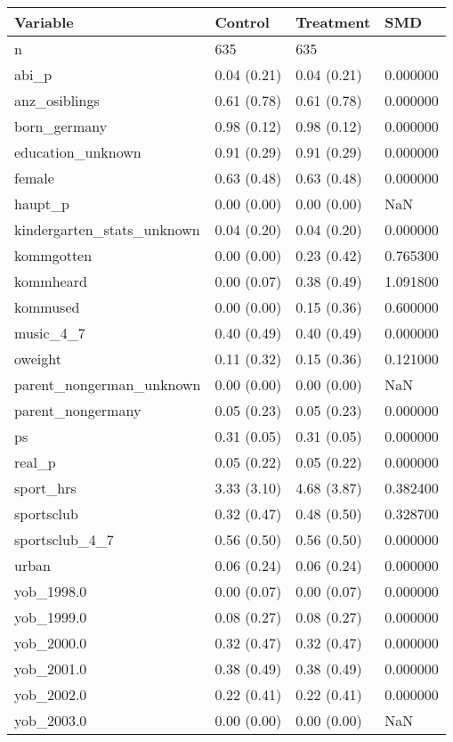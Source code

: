 \begin{tabular}{llll}
\toprule
Variable & Control & Treatment & SMD \\
\midrule
n & 635 & 635 &  \\
abi\_p & 0.04 (0.21) & 0.04 (0.21) & 0.000000 \\
anz\_osiblings & 0.61 (0.78) & 0.61 (0.78) & 0.000000 \\
born\_germany & 0.98 (0.12) & 0.98 (0.12) & 0.000000 \\
education\_unknown & 0.91 (0.29) & 0.91 (0.29) & 0.000000 \\
female & 0.63 (0.48) & 0.63 (0.48) & 0.000000 \\
haupt\_p & 0.00 (0.00) & 0.00 (0.00) & NaN \\
kindergarten\_stats\_unknown & 0.04 (0.20) & 0.04 (0.20) & 0.000000 \\
kommgotten & 0.00 (0.00) & 0.23 (0.42) & 0.765300 \\
kommheard & 0.00 (0.07) & 0.38 (0.49) & 1.091800 \\
kommused & 0.00 (0.00) & 0.15 (0.36) & 0.600000 \\
music\_4\_7 & 0.40 (0.49) & 0.40 (0.49) & 0.000000 \\
oweight & 0.11 (0.32) & 0.15 (0.36) & 0.121000 \\
parent\_nongerman\_unknown & 0.00 (0.00) & 0.00 (0.00) & NaN \\
parent\_nongermany & 0.05 (0.23) & 0.05 (0.23) & 0.000000 \\
ps & 0.31 (0.05) & 0.31 (0.05) & 0.000000 \\
real\_p & 0.05 (0.22) & 0.05 (0.22) & 0.000000 \\
sport\_hrs & 3.33 (3.10) & 4.68 (3.87) & 0.382400 \\
sportsclub & 0.32 (0.47) & 0.48 (0.50) & 0.328700 \\
sportsclub\_4\_7 & 0.56 (0.50) & 0.56 (0.50) & 0.000000 \\
urban & 0.06 (0.24) & 0.06 (0.24) & 0.000000 \\
yob\_1998.0 & 0.00 (0.07) & 0.00 (0.07) & 0.000000 \\
yob\_1999.0 & 0.08 (0.27) & 0.08 (0.27) & 0.000000 \\
yob\_2000.0 & 0.32 (0.47) & 0.32 (0.47) & 0.000000 \\
yob\_2001.0 & 0.38 (0.49) & 0.38 (0.49) & 0.000000 \\
yob\_2002.0 & 0.22 (0.41) & 0.22 (0.41) & 0.000000 \\
yob\_2003.0 & 0.00 (0.00) & 0.00 (0.00) & NaN \\
\bottomrule
\end{tabular}
